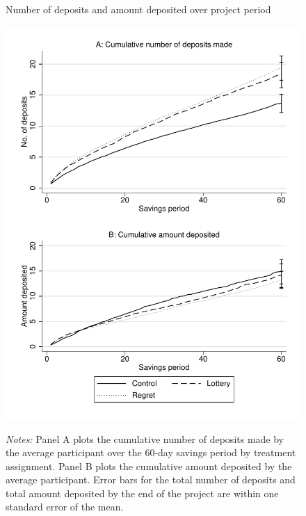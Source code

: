 \documentclass[11pt]{article}
\begin{document}
		\begin{figure}[h]
			\caption{Number of deposits and amount deposited over project period}
			\includegraphics[height=0.85\textheight]{../../figures/line-cumdeposits.pdf}
			\label{fig:line-cumdeposits}
			\caption*{\footnotesize \emph{Notes:} Panel A plots the cumulative number of deposits made by the average participant over the 60-day savings period by treatment assignment. Panel B plots the cumulative amount deposited by the average participant. Error bars for the total number of deposits and total amount deposited by the end of the project are within one standard error of the mean.}
		\end{figure}

		
		
		
		

\end{document}

